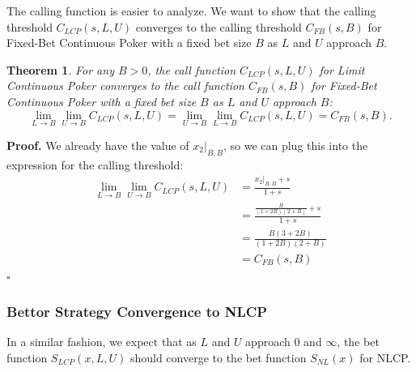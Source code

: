 \documentclass[a4paper,12pt]{article}
\theoremstyle{plain}
\newtheorem{theorem}{Theorem}[section]
\theoremstyle{definition}
\newenvironment{customproof}[1][Proof]{\noindent\textbf{#1.} }{\hfill$\square$\vspace{1em}}
\begin{document}
The calling function is easier to analyze. We want to show that the calling threshold $C_{LCP}(s, L, U)$ converges to the calling threshold $C_{FB}(s, B)$ for Fixed-Bet Continuous Poker with a fixed bet size $B$ as $L$ and $U$ approach $B$.

\begin{theorem}
     For any $B > 0$, the call function $C_{LCP}(s, L, U)$ for Limit Continuous Poker converges to the call function $C_{FB}(s, B)$ for Fixed-Bet Continuous Poker with a fixed bet size $B$ as $L$ and $U$ approach $B$:
\[
\lim_{L \to B} \lim_{U \to B} C_{LCP}(s, L, U) = \lim_{U \to B} \lim_{L \to B} C_{LCP}(s, L, U) = C_{FB}(s, B).
\]
\end{theorem}

\begin{customproof}
We already have the value of $x_2|_{B,B}$, so we can plug this into the expression for the calling threshold:
\begin{align*}
    \lim_{L \to B} \lim_{U \to B} C_{LCP}(s, L, U) & = \frac{x_2|_{B,B}+s}{1+s} \\
    & = \frac{\frac{B}{(1+2B)(2+B)} + s}{1+s} \\
    & = \frac{B(3+2B)}{(1+2B)(2+B)} \\
    & = C_{FB}(s, B)
\end{align*}
\end{customproof}

\subsubsection{Bettor Strategy Convergence to NLCP}

In a similar fashion, we expect that as $L$ and $U$ approach $0$ and $\infty$, the bet function $S_{LCP}(x, L, U)$ should converge to the bet function $S_{NL}(x)$ for NLCP.
\end{document}
